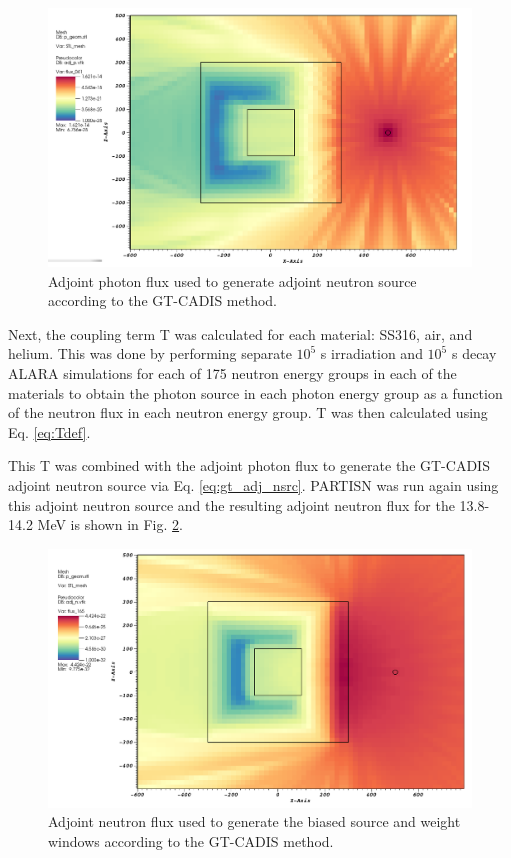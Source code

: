 \begin{figure}
	\includegraphics[scale=0.4]{figs/gtcadis_adj_p_g41.png}
	\caption [GT-CADIS adjoint photon flux] 
	{Adjoint photon flux used to generate adjoint neutron source according
	to the GT-CADIS method.\label{fig:ex.adj_p_flux}}
\end{figure}


Next, the coupling term T was calculated for each material: SS316, air, and
helium.  This was done by performing separate $10^5$ s irradiation and $10^5$ s decay
ALARA simulations for each of 175 neutron energy groups in each of the materials to 
obtain the photon source in each photon energy group as a function of the
neutron flux in each neutron energy group.  T was then calculated using 
Eq. \ref{eq:Tdef}.

This T was combined with the adjoint photon flux to generate the GT-CADIS
adjoint neutron source via Eq. \ref{eq:gt_adj_nsrc}. 
PARTISN was run again using this adjoint neutron source and the resulting
adjoint neutron flux for the 13.8-14.2 MeV is shown in Fig.
\ref{fig:ex.adj_n_flux}.

\begin{figure}
	\includegraphics[scale=0.4]{figs/gtcadis_adj_n_g216.png}
	\caption [GT-CADIS adjoint neutron flux] 
	{Adjoint neutron flux used to generate the biased source and weight
	windows according to the GT-CADIS method.\label{fig:ex.adj_n_flux} }
\end{figure}

